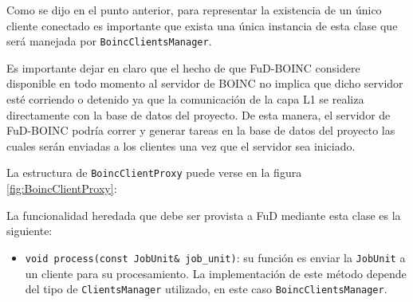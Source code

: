 Como se dijo en el punto anterior, para representar la existencia de un único cliente conectado es importante que exista una única instancia de esta clase que será manejada por \texttt{BoincClientsManager}.

Es importante dejar en claro que el hecho de que FuD-BOINC considere disponible en todo momento al servidor de BOINC no implica que dicho servidor esté corriendo o detenido ya que la comunicación de la capa L1 se realiza directamente con la base de datos del proyecto. De esta manera, el servidor de FuD-BOINC podría correr y generar tareas en la base de datos del proyecto las cuales serán enviadas a los clientes una vez que el servidor sea iniciado.

La estructura de \texttt{BoincClientProxy} puede verse en la figura \ref{fig:BoincClientProxy}:

La funcionalidad heredada que debe ser provista a FuD mediante esta clase es la siguiente:

\begin{itemize}
\item \texttt{void process(const JobUnit\& job\_unit)}: su función es enviar la \texttt{JobUnit} a un cliente para su procesamiento. La implementación de este método depende del tipo de \texttt{ClientsManager} utilizado, en este caso \texttt{BoincClientsManager}.
\end{itemize}

